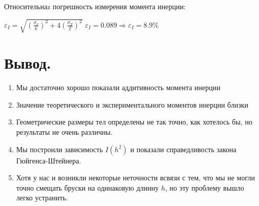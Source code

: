\documentclass[12pt,a4paper]{article}
\begin{document}
		Относительнаz погрешность измерения момента инерции:
		\begin{flushleft}
			\begin{spacing}{1.4}
				$ \varepsilon_{I} = \sqrt{\left(\frac{\sigma_{k}}{k}\right)^2 + 4\left(\frac{\sigma_{T}}{T}\right)^2} $
				$ \varepsilon_{I} = 0.089\Rightarrow\varepsilon_{I}=8.9\% $
			\end{spacing} 
		\end{flushleft} 
		 
		\newpage		 
		 
\section{Вывод.}
\begin{enumerate}
\item Мы достаточно хорошо показали аддитивность момента инерции 
\item Значение теоретического и экспериментального моментов инерции близки
\item Геометрические размеры тел определены не так точно, как хотелось бы, но результаты не очень различны.
\item Мы построили зависимость $I(h^2)$ и показали справедливость закона Гюйгенса-Штейнера. 
\item Хотя у нас и возникли некоторые неточности всвязи с тем, что мы не могли точно смещать бруски на одинаковую длинну $h$, но эту проблему вышло легко устранить. 
\end{enumerate}	
\end{document}
